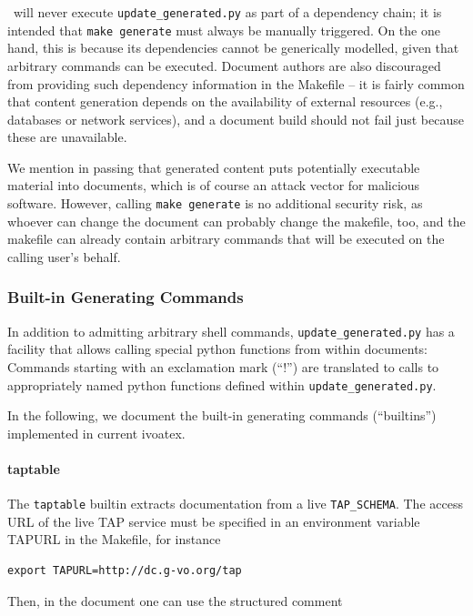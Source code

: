 \documentclass[11pt,a4paper]{ivoa}
\begin{document}
\ivoatex~will never execute \texttt{update\_generated.py} as part of a
dependency chain; it is intended that \texttt{make generate} must always
be manually triggered.  On the one hand, this is because its
dependencies cannot be generically modelled, given that arbitrary
commands can be executed.  Document authors are also discouraged from
providing such dependency information in
the Makefile -- it is fairly common that
content generation depends on the availability of external resources
(e.g., databases or network services), and a document build should not
fail just because these are unavailable.

We mention in passing that generated content puts potentially executable
material into documents, which is of course an attack vector for
malicious software.  However, calling \texttt{make generate} is no
additional security risk, as whoever can change the document can
probably change the makefile, too, and the makefile can already contain
arbitrary commands that will be executed on the calling user's behalf.


\subsubsection{Built-in Generating Commands}

In addition to admitting arbitrary shell
commands, \texttt{update\_generated.py} has a facility that allows
calling special python functions from within documents: Commands
starting with an exclamation mark (``!'') are translated to calls to
appropriately named python functions defined within
\texttt{update\_generated.py}.

In the following, we document the built-in generating commands
(``builtins'') implemented in current ivoatex.

\paragraph{taptable}

The \texttt{taptable} builtin extracts documentation from a
live \texttt{TAP\_SCHEMA}.  The access URL of the
live TAP service must be specified in an environment variable TAPURL in
the Makefile, for instance

\begin{lstlisting}
export TAPURL=http://dc.g-vo.org/tap
\end{lstlisting}

Then, in the document one can use the structured comment
\end{document}
